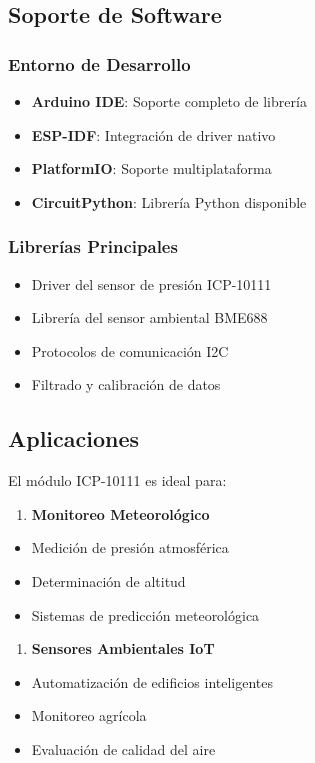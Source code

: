 \documentclass[11pt,a4paper]{article}
\begin{document}
\subsection{Soporte de Software}

\subsubsection{Entorno de Desarrollo}
\begin{itemize}
\item \textbf{Arduino IDE}: Soporte completo de librería
\item \textbf{ESP-IDF}: Integración de driver nativo
\item \textbf{PlatformIO}: Soporte multiplataforma
\item \textbf{CircuitPython}: Librería Python disponible
\end{itemize}

\subsubsection{Librerías Principales}
\begin{itemize}
\item Driver del sensor de presión ICP-10111
\item Librería del sensor ambiental BME688
\item Protocolos de comunicación I2C
\item Filtrado y calibración de datos
\end{itemize}

\subsection{Aplicaciones}

El módulo ICP-10111 es ideal para:

\begin{enumerate}
\item \textbf{Monitoreo Meteorológico}
\end{enumerate}
\begin{itemize}
\item Medición de presión atmosférica
\item Determinación de altitud
\item Sistemas de predicción meteorológica
\end{itemize}

\begin{enumerate}
\item \textbf{Sensores Ambientales IoT}
\end{enumerate}
\begin{itemize}
\item Automatización de edificios inteligentes
\item Monitoreo agrícola
\item Evaluación de calidad del aire
\end{itemize}
\end{document}
